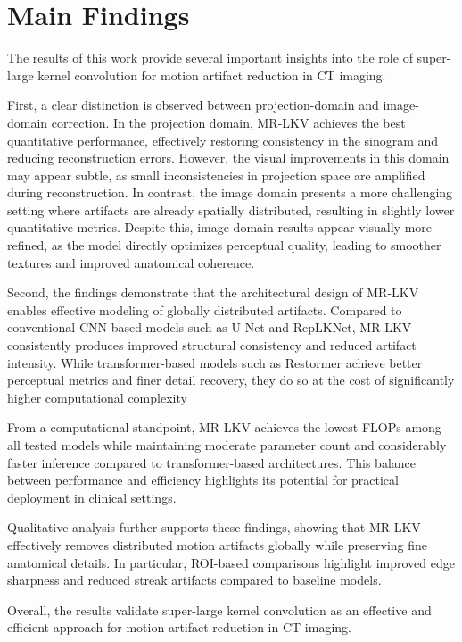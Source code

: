 \section{Main Findings}

The results of this work provide several important insights into the role of super-large kernel convolution for motion artifact reduction in CT imaging.

 First, a clear distinction is observed between projection-domain and image-domain correction. In the projection domain, MR-LKV achieves the best quantitative performance, effectively restoring consistency in the sinogram and reducing reconstruction errors. However, the visual improvements in this domain may appear subtle, as small inconsistencies in projection space are amplified during reconstruction. In contrast, the image domain presents a more challenging setting where artifacts are already spatially distributed, resulting in slightly lower quantitative metrics. Despite this, image-domain results appear visually more refined, as the model directly optimizes perceptual quality, leading to smoother textures and improved anatomical coherence.

 Second, the findings demonstrate that the architectural design of MR-LKV enables effective modeling of globally distributed artifacts. Compared to conventional CNN-based models such as U-Net and RepLKNet, MR-LKV consistently produces improved structural consistency and reduced artifact intensity. While transformer-based models such as Restormer achieve better perceptual metrics and finer detail recovery, they do so at the cost of significantly higher computational complexity 

From a computational standpoint, MR-LKV achieves the lowest FLOPs among all tested models while maintaining moderate parameter count and considerably faster inference compared to transformer-based architectures. This balance between performance and efficiency highlights its potential for practical deployment in clinical settings. 

Qualitative analysis further supports these findings, showing that MR-LKV effectively removes distributed motion artifacts globally while preserving fine anatomical details. In particular, ROI-based comparisons highlight improved edge sharpness and reduced streak artifacts compared to baseline models.

Overall, the results validate super-large kernel convolution as an effective and efficient approach for motion artifact reduction in CT imaging.

